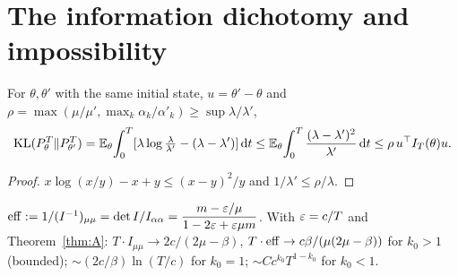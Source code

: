 \section{The information dichotomy and impossibility}\label{sec:dichotomy}

\begin{lemma}[KL bound]\label{lem:KL}\Pt{}
For $\theta,\theta'$ with the same initial state, $u=\theta'-\theta$ and $\rho=\max(\mu/\mu',\max_k\alpha_k/\alpha'_k)\ge\sup\lambda/\lambda'$,
\[
\mathrm{KL}(P_\theta^T\|P_{\theta'}^T)=\mathbb{E}_\theta\!\int_0^T[\lambda\log\tfrac\lambda{\lambda'}-(\lambda-\lambda')]\,\mathrm d t\le\mathbb{E}_\theta\!\int_0^T\frac{(\lambda-\lambda')^2}{\lambda'}\,\mathrm d t\le\rho\,u^{\top} I_T(\theta)u.
\]
\end{lemma}
\begin{proof}
$x\log(x/y)-x+y\le(x-y)^2/y$ and $1/\lambda'\le\rho/\lambda$.
\end{proof}

\begin{proposition}[efficient information, $K=1$]\label{prop:eff}\Pt{}
$\mathrm{eff}:=1/(I^{-1})_{\mu\mu}=\det I/I_{\alpha\alpha}=\dfrac{m-\varepsilon/\mu}{1-2\varepsilon+\varepsilon\mu m}$. With $\varepsilon=c/T$ and Theorem~\ref{thm:A}: $T\cdot I_{\mu\mu}\to2c/(2\mu-\beta)$, $T\cdot\mathrm{eff}\to c\beta/(\mu(2\mu-\beta))$ for $k_0>1$ (bounded); $\sim(2c/\beta)\ln(T/c)$ for $k_0=1$; $\sim Cc^{k_0}T^{1-k_0}$ for $k_0<1$.
\end{proposition}

